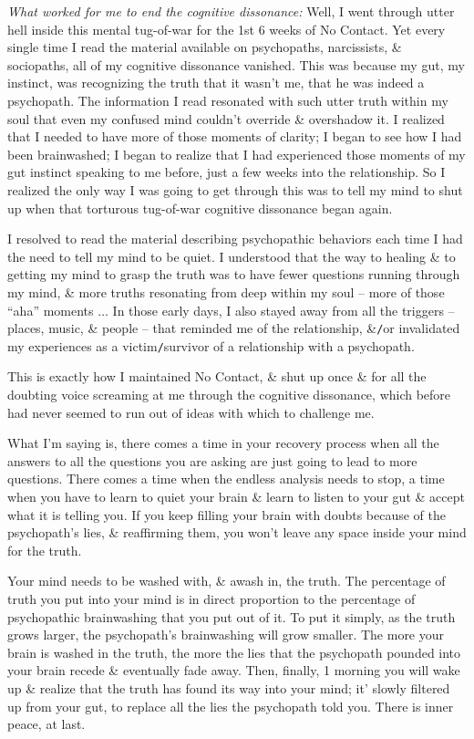 \documentclass{article}
\numberwithin{equation}{section}
\begin{document}
\textit{What worked for me to end the cognitive dissonance:} Well, I went through utter hell inside this mental tug-of-war for the 1st 6 weeks of No Contact. Yet every single time I read the material available on psychopaths, narcissists, \& sociopaths, all of my cognitive dissonance vanished. This was because my gut, my instinct, was recognizing the truth that it wasn't me, that he was indeed a psychopath. The information I read resonated with such utter truth within my soul that even my confused mind couldn't override \& overshadow it. I realized that I needed to have more of those moments of clarity; I began to see how I had been brainwashed; I began to realize that I had experienced those moments of my gut instinct speaking to me before, just a few weeks into the relationship. So I realized the only way I was going to get through this was to tell my mind to shut up when that torturous tug-of-war cognitive dissonance began again.

I resolved to read the material describing psychopathic behaviors each time I had the need to tell my mind to be quiet. I understood that the way to healing \& to getting my mind to grasp the truth was to have fewer questions running through my mind, \& more truths resonating from deep within my soul -- more of those ``aha'' moments $\ldots$ In those early days, I also stayed away from all the triggers -- places, music, \& people -- that reminded me of the relationship, \&\texttt{/}or invalidated my experiences as a victim\texttt{/}survivor of a relationship with a psychopath.

This is exactly how I maintained No Contact, \& shut up once \& for all the doubting voice screaming at me through the cognitive dissonance, which before had never seemed to run out of ideas with which to challenge me.

What I'm saying is, there comes a time in your recovery process when all the answers to all the questions you are asking are just going to lead to more questions. There comes a time when the endless analysis needs to stop, a time when you have to learn to quiet your brain \& learn to listen to your gut \& accept what it is telling you. If you keep filling your brain with doubts because of the psychopath's lies, \& reaffirming them, you won't leave any space inside your mind for the truth.

Your mind needs to be washed with, \& awash in, the truth. The percentage of truth you put into your mind is in direct proportion to the percentage of psychopathic brainwashing that you put out of it. To put it simply, as the truth grows larger, the psychopath's brainwashing will grow smaller. The more your brain is washed in the truth, the more the lies that the psychopath pounded into your brain recede \& eventually fade away. Then, finally, 1 morning you will wake up \& realize that the truth has found its way into your mind; it' slowly filtered up from your gut, to replace all the lies the psychopath told you. There is inner peace, at last.
\end{document}

